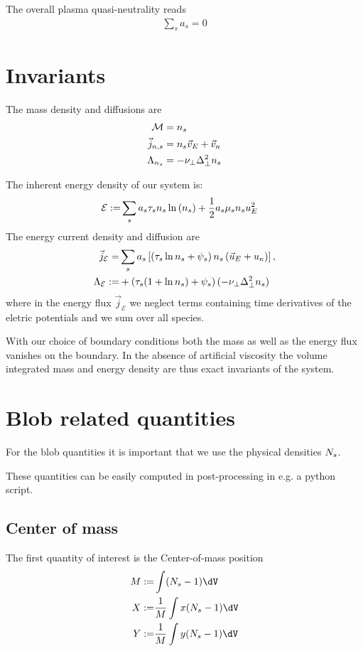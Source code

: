 The overall plasma quasi-neutrality reads
\begin{align}
    \sum_s a_s = 0
\end{align}
\section{Invariants}
The mass density and diffusions are
\begin{align}
    \mathcal M &= {n_s}  \\
    \vec j_{n,s} &= {n_s}  \vec v_E + \vec v_\kappa \\
     \Lambda_{{n_s} } &= -\nu_\perp \Delta_\perp^2 {n_s} 
\end{align}

The inherent energy density of our system is:
\begin{align}
 \mathcal{E} := &
 \sum_s a_s \tau_s {n_s}  \ln{(\ensuremath{{n_s} })} + \frac{1}{2} a_s \mu_s {n_s}  u_E^2
\end{align}
The energy current density and diffusion are
\begin{align}
  \vec j_{\mathcal E} =& \sum_s a_s\left[
  \left(\tau_s \ln {n_s}  + \psi_s \right){n_s} \left(
  \vec u_E + u_\kappa \right) \right]
  , \\
    \Lambda_\mathcal{E} :=  &+ \left( \tau_s ( 1+\ln {n_s} ) + \psi_s\right)(-\nu_\perp \Delta_\perp^2 {n_s} )
    \label{eq:energy_diffusion}
\end{align}
where in the energy flux $\vec j_{\mathcal E}$
we neglect terms  containing time derivatives
of the eletric potentials and we sum over all species.

With our choice of boundary conditions both the mass as well as the energy flux
vanishes on the boundary. In the absence of artificial viscosity the volume integrated
mass and energy density are thus exact invariants of the system.
\section{Blob related quantities}
For the blob quantities it is important that we use the physical densities ${N_s} $.
\begin{tcolorbox}[title=Note]
    These quantities can be easily computed in post-processing in e.g. a python script.
\end{tcolorbox}

\subsection{Center of mass}
The first quantity of interest is the Center-of-mass position
\begin{align}
    M :=& \int (\physs -1 ) \dV \\
    X :=& \frac{1}{M} \int x(\physs - 1) \dV \\
    Y :=& \frac{1}{M} \int y(\physs - 1) \dV
\end{align}
